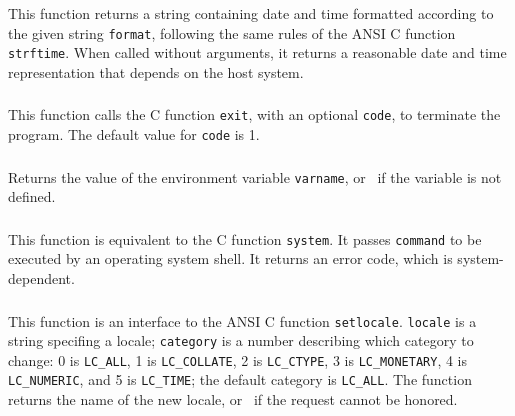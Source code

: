 \subsubsection*{\ff {}}

This function returns a string containing date and time
formatted according to the given string \verb|format|,
following the same rules of the ANSI C function \verb|strftime|.
When called without arguments,
it returns a reasonable date and time representation that depends on
the host system.

\subsubsection*{\ff {}}

This function calls the C function \verb|exit|,
with an optional \verb|code|,
to terminate the program.
The default value for \verb|code| is 1.

\subsubsection*{\ff {}}

Returns the value of the environment variable \verb|varname|,
or \nil\ if the variable is not defined.

\subsubsection*{\ff {}}

This function is equivalent to the C function \verb|system|.
It passes \verb|command| to be executed by an operating system shell.
It returns an error code, which is system-dependent.

\subsubsection*{\ff {}}

This function is an interface to the ANSI C function \verb|setlocale|.
\verb|locale| is a string specifing a locale;
\verb|category| is a number describing which category to change:
0 is \verb|LC_ALL|, 1 is \verb|LC_COLLATE|, 2 is \verb|LC_CTYPE|,
3 is \verb|LC_MONETARY|, 4 is \verb|LC_NUMERIC|, and 5 is \verb|LC_TIME|;
the default category is \verb|LC_ALL|.
The function returns the name of the new locale,
or \nil\ if the request cannot be honored.


